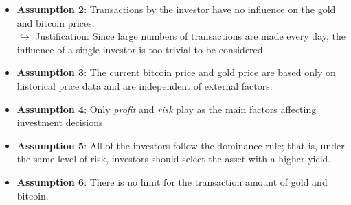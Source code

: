 \documentclass{mcmthesis}
\begin{document}
{\begin{itemize}
		\begin{figure}[h]
			\centering \texttt{[image: PriceCorr]}
			\caption{Scatter plot of gold ($x$-axis) and bitcoin ($y$-axis) prices ($R^2$-score = 0.546569)}
		\end{figure}
		
		\item \textbf{Assumption 2}: 
		Transactions by the investor have no influence on the gold and bitcoin prices. 
		\\ $\hookrightarrow$ Justification: 
		Since large numbers of transactions are made every day, the influence of a single investor is too trivial to be considered. 
		
		\item \textbf{Assumption 3}: 
		The current bitcoin price and gold price are based only on historical price data and are independent of external factors. 
		
		\item \textbf{Assumption 4}: 
		Only \textit{profit} and \textit{risk} play as the main factors affecting investment decisions. 
		
		\item \textbf{Assumption 5}: 
		All of the investors follow the dominance rule; that is, under the same level of risk, investors should 
		select the asset with a higher yield. 
		
		\item \textbf{Assumption 6}: 
		There is no limit for the transaction amount of gold and bitcoin. 
	\end{itemize}
		
}
\end{document}
